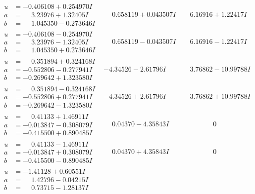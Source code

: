 \documentclass[1p]{elsarticle_modified}
\theoremstyle{definition}
\begin{document}
$$\begin{array}{c|c|c}
\begin{aligned}
u &= -0.406108 + 0.254970 I \\
a &= \phantom{-}3.23976 + 1.32405 I \\
b &= \phantom{-}1.045350 - 0.273646 I\end{aligned}
 & \phantom{-}0.658119 + 0.043507 I & \phantom{-}6.16916 + 1.22417 I \\ \hline\begin{aligned}
u &= -0.406108 - 0.254970 I \\
a &= \phantom{-}3.23976 - 1.32405 I \\
b &= \phantom{-}1.045350 + 0.273646 I\end{aligned}
 & \phantom{-}0.658119 - 0.043507 I & \phantom{-}6.16916 - 1.22417 I \\ \hline\begin{aligned}
u &= \phantom{-}0.351894 + 0.324168 I \\
a &= -0.552806 - 0.277941 I \\
b &= -0.269642 + 1.323580 I\end{aligned}
 & -4.34526 - 2.61796 I & \phantom{-}3.76862 - 10.99788 I \\ \hline\begin{aligned}
u &= \phantom{-}0.351894 - 0.324168 I \\
a &= -0.552806 + 0.277941 I \\
b &= -0.269642 - 1.323580 I\end{aligned}
 & -4.34526 + 2.61796 I & \phantom{-}3.76862 + 10.99788 I \\ \hline\begin{aligned}
u &= \phantom{-}0.41133 + 1.46911 I \\
a &= -0.013847 - 0.308079 I \\
b &= -0.415500 + 0.890485 I\end{aligned}
 & \phantom{-}0.04370 - 4.35843 I & \phantom{-0.000000 } 0 \\ \hline\begin{aligned}
u &= \phantom{-}0.41133 - 1.46911 I \\
a &= -0.013847 + 0.308079 I \\
b &= -0.415500 - 0.890485 I\end{aligned}
 & \phantom{-}0.04370 + 4.35843 I & \phantom{-0.000000 } 0 \\ \hline\begin{aligned}
u &= -1.41128 + 0.60551 I \\
a &= \phantom{-}1.42796 - 0.04215 I \\
b &= \phantom{-}0.73715 - 1.28137 I\end{aligned}

\end{array}$$
\end{document}
